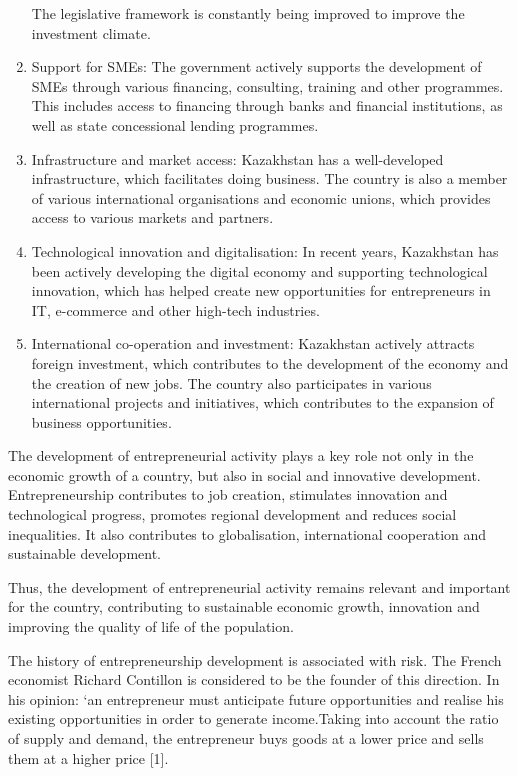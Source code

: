 \begin{multicols}{2}
\begin{enumerate}
  The legislative framework is constantly being improved to improve the investment climate.

\item
  Support for SMEs: The government actively supports the development of
  SMEs through various financing, consulting, training and other
  programmes. This includes access to financing through banks and
  financial institutions, as well as state concessional lending
  programmes.
\item
  Infrastructure and market access: Kazakhstan has a well-developed
  infrastructure, which facilitates doing business. The country is also
  a member of various international organisations and economic unions,
  which provides access to various markets and partners.
\item
  Technological innovation and digitalisation: In recent years,
  Kazakhstan has been actively developing the digital economy and
  supporting technological innovation, which has helped create new
  opportunities for entrepreneurs in IT, e-commerce and other high-tech
  industries.
\item
  International co-operation and investment: Kazakhstan actively
  attracts foreign investment, which contributes to the development of
  the economy and the creation of new jobs. The country also
  participates in various international projects and initiatives, which
  contributes to the expansion of business opportunities.
\end{enumerate}

The development of entrepreneurial activity plays a key role not only in
the economic growth of a country, but also in social and innovative
development. Entrepreneurship contributes to job creation, stimulates
innovation and technological progress, promotes regional development and
reduces social inequalities. It also contributes to globalisation,
international cooperation and sustainable development.

Thus, the development of entrepreneurial activity remains relevant and
important for the country, contributing to sustainable economic growth,
innovation and improving the quality of life of the population.

The history of entrepreneurship development is associated with risk. The
French economist Richard Contillon is considered to be the founder of
this direction. In his opinion: `an entrepreneur must anticipate future
opportunities and realise his existing opportunities in order to
generate income.Taking into account the ratio of supply and demand, the
entrepreneur buys goods at a lower price and sells them at a higher
price {[}1{]}.


\end{multicols}
